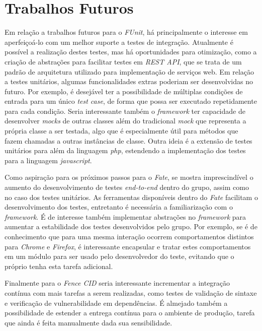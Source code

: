 \hypertarget{trabalhos-futuros}{%
\section{Trabalhos Futuros}\label{trabalhos-futuros}}

Em relação a trabalhos futuros para o \emph{FUnit}, há principalmente o interesse em aperfeiçoá-lo com um melhor suporte a testes de integração. Atualmente é possível a realização destes testes, mas há oportunidades para otimização, como a criação de abstrações para facilitar testes em \emph{REST API}, que se trata de um padrão de arquitetura utilizado para implementação de serviços web. Em relação a testes unitários, algumas funcionalidades extras poderiam ser desenvolvidas no futuro. Por exemplo, é desejável ter a possibilidade de múltiplas condições de entrada para um único \emph{test case}, de forma que possa ser executado repetidamente para cada condição. Seria interessante também o \emph{framework} ter capacidade de desenvolver \emph{mocks} de outras classes além do tradicional \emph{mock} que representa a própria classe a ser testada, algo que é especialmente útil para métodos que fazem chamadas a outras instâncias de classe. Outra ideia é a extensão de testes unitários para além da linguagem \emph{php}, estendendo a implementação dos testes para a linguagem \emph{javascript}.

Como aspiração para os próximos passos para o \emph{Fate}, se mostra imprescindível o aumento do desenvolvimento de testes \emph{end-to-end} dentro do grupo, assim como no caso dos testes unitários. As ferramentas disponíveis dentro do \emph{Fate} facilitam o desenvolvimento dos testes, entretanto é necessária a familiarização com o \emph{framework}. É de interesse também implementar abstrações no \emph{framework} para aumentar a estabilidade dos testes desenvolvidos pelo grupo. Por exemplo, se é de conhecimento que para uma mesma interação ocorrem comportamentos distintos para \emph{Chrome} e \emph{Firefox}, é interessante encapsular e tratar estes comportamentos em um módulo para ser usado pelo desenvolvedor do teste, evitando que o próprio tenha esta tarefa adicional.

Finalmente para o \emph{Fence CID} seria interessante incrementar a integração contínua com mais tarefas a serem realizadas, como testes de validação de sintaxe e verificação de vulnerabilidade em dependências. É almejado também a possibilidade de estender a entrega contínua para o ambiente de produção, tarefa que ainda é feita manualmente dada sua sensibilidade.